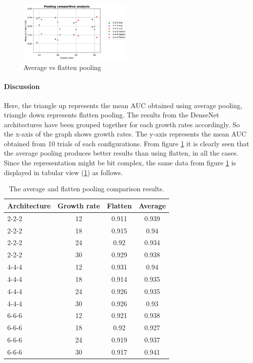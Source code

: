 \begin{figure}[ht]
\centering
\includegraphics[width=0.5\textwidth]{images/densenet/simple/densenet_simple_three_layer_pooling_compare}
\caption{Average vs flatten pooling}
\label{fig:densenet_simple_three_layer_pooling_compare}
\end{figure}

\paragraph{Discussion\\}
Here, the triangle up represents the mean AUC obtained using average pooling, triangle down represents flatten pooling. The results from the DenseNet
architectures have been grouped together for each growth rates accordingly. So the x-axis of the graph shows growth rates. The y-axis represents the mean AUC obtained from 10 trials of each configurations.
From figure \ref{fig:densenet_simple_three_layer_pooling_compare} it is clearly seen that the average pooling produces better results than using flatten, in all the cases. 
Since the representation might be bit complex, the same data from figure \ref{fig:densenet_simple_three_layer_pooling_compare} is displayed in tabular view (\ref{table:pooling_comparison_across_gr}) as follows.

\begin{table}[ht]
\centering
 \caption[The average and flatten pooling comparison results.]{The average and flatten pooling comparison results.}
\begin{tabular}{|l | c| c| c|} 
 \hline\hline
 \rowcolor{lightgrey}
 Architecture &  Growth rate &  Flatten &  Average\\[0.5ex]
 \hline
  2-2-2 &  12 &  0.911 &  0.939\\
  2-2-2 &  18 &  0.915 &  0.94\\
  2-2-2 &  24 &  0.92 &  0.934\\
  2-2-2 &  30 &  0.929 &  0.938\\
  4-4-4 &  12 &  0.931 &  0.94\\
  4-4-4 &  18 &  0.914 &  0.935\\
  4-4-4 &  24 &  0.926 &  0.935\\
  4-4-4 &  30 &  0.926 &  0.93\\
  6-6-6 &  12 &  0.921 &  0.938\\
  6-6-6 &  18 &  0.92 &  0.927\\
  6-6-6 &  24 &  0.919 &  0.937\\
  6-6-6 &  30 &  0.917 &  0.941\\ \hline \hline
 \end{tabular}
\label{table:pooling_comparison_across_gr}
\end{table}

